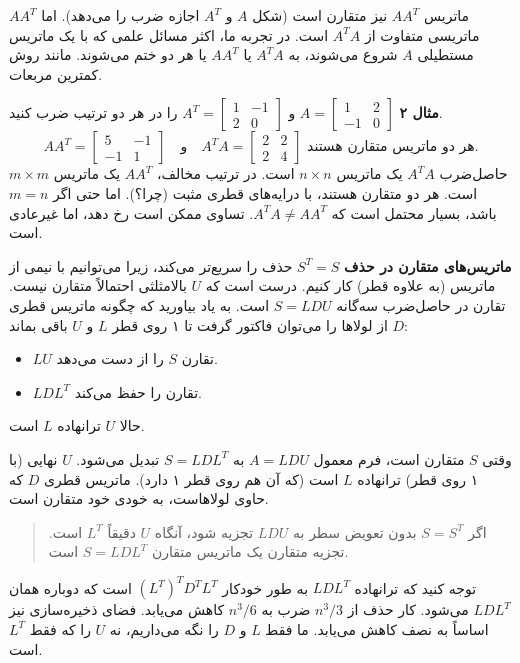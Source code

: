 \documentclass[12pt, a4paper]{book}
\begin{document}
	ماتریس $AA^T$ نیز متقارن است (شکل $A$ و $A^T$ اجازه ضرب را می‌دهد). اما $AA^T$ ماتریسی متفاوت از $A^TA$ است. در تجربه ما، اکثر مسائل علمی که با یک ماتریس مستطیلی $A$ شروع می‌شوند، به $A^TA$ یا $AA^T$ یا هر دو ختم می‌شوند. مانند روش کمترین مربعات.
	
	\textbf{مثال ۲} $A = \begin{bmatrix} 1 & 2 \\ -1 & 0 \end{bmatrix}$ و $A^T = \begin{bmatrix} 1 & -1 \\ 2 & 0 \end{bmatrix}$ را در هر دو ترتیب ضرب کنید.
	\[ AA^T = \begin{bmatrix} 5 & -1 \\ -1 & 1 \end{bmatrix} \quad \text{و} \quad A^TA = \begin{bmatrix} 2 & 2 \\ 2 & 4 \end{bmatrix} \text{ هر دو ماتریس متقارن هستند.} \]
	حاصل‌ضرب $A^TA$ یک ماتریس $n \times n$ است. در ترتیب مخالف، $AA^T$ یک ماتریس $m \times m$ است. هر دو متقارن هستند، با درایه‌های قطری مثبت (چرا؟). اما حتی اگر $m=n$ باشد، بسیار محتمل است که $A^TA \neq AA^T$. تساوی ممکن است رخ دهد، اما غیرعادی است.
	
	\textbf{ماتریس‌های متقارن در حذف} $S^T=S$ حذف را سریع‌تر می‌کند، زیرا می‌توانیم با نیمی از ماتریس (به علاوه قطر) کار کنیم. درست است که $U$ بالامثلثی احتمالاً متقارن نیست. تقارن در حاصل‌ضرب سه‌گانه $S=LDU$ است. به یاد بیاورید که چگونه ماتریس قطری $D$ از لولاها را می‌توان فاکتور گرفت تا ۱ روی قطر $L$ و $U$ باقی بماند:
	\begin{itemize}
		\item $LU$ تقارن $S$ را از دست می‌دهد.
		\item $LDL^T$ تقارن را حفظ می‌کند.
	\end{itemize}
	حالا $U$ ترانهاده $L$ است.
	
	وقتی $S$ متقارن است، فرم معمول $A=LDU$ به $S=LDL^T$ تبدیل می‌شود. $U$ نهایی (با ۱ روی قطر) ترانهاده $L$ است (که آن هم روی قطر ۱ دارد). ماتریس قطری $D$ که حاوی لولاهاست، به خودی خود متقارن است.
	\begin{quote}
		اگر $S=S^T$ بدون تعویض سطر به $LDU$ تجزیه شود، آنگاه $U$ دقیقاً $L^T$ است. تجزیه متقارن یک ماتریس متقارن $S=LDL^T$ است.
	\end{quote}
	توجه کنید که ترانهاده $LDL^T$ به طور خودکار $(L^T)^TD^TL^T$ است که دوباره همان $LDL^T$ می‌شود. کار حذف از $n^3/3$ ضرب به $n^3/6$ کاهش می‌یابد. فضای ذخیره‌سازی نیز اساساً به نصف کاهش می‌یابد. ما فقط $L$ و $D$ را نگه می‌داریم، نه $U$ را که فقط $L^T$ است.
	
\end{document}

